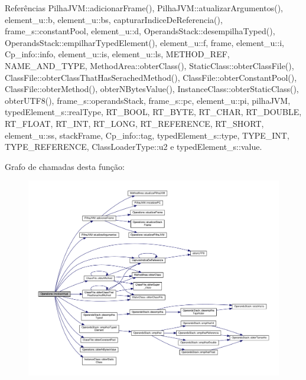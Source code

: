 Referências Pilha\+J\+V\+M\+::adicionar\+Frame(), Pilha\+J\+V\+M\+::atualizar\+Argumentos(), element\+\_\+u\+::b, element\+\_\+u\+::bs, capturar\+Indice\+De\+Referencia(), frame\+\_\+s\+::constant\+Pool, element\+\_\+u\+::d, Operands\+Stack\+::desempilha\+Typed(), Operands\+Stack\+::empilhar\+Typed\+Element(), element\+\_\+u\+::f, frame, element\+\_\+u\+::i, Cp\+\_\+info\+::info, element\+\_\+u\+::is, element\+\_\+u\+::ls, M\+E\+T\+H\+O\+D\+\_\+\+R\+EF, N\+A\+M\+E\+\_\+\+A\+N\+D\+\_\+\+T\+Y\+PE, Method\+Area\+::obter\+Class(), Static\+Class\+::obter\+Class\+File(), Class\+File\+::obter\+Class\+That\+Has\+Serached\+Method(), Class\+File\+::obter\+Constant\+Pool(), Class\+File\+::obter\+Method(), obter\+N\+Bytes\+Value(), Instance\+Class\+::obter\+Static\+Class(), obter\+U\+T\+F8(), frame\+\_\+s\+::operands\+Stack, frame\+\_\+s\+::pc, element\+\_\+u\+::pi, pilha\+J\+VM, typed\+Element\+\_\+s\+::real\+Type, R\+T\+\_\+\+B\+O\+OL, R\+T\+\_\+\+B\+Y\+TE, R\+T\+\_\+\+C\+H\+AR, R\+T\+\_\+\+D\+O\+U\+B\+LE, R\+T\+\_\+\+F\+L\+O\+AT, R\+T\+\_\+\+I\+NT, R\+T\+\_\+\+L\+O\+NG, R\+T\+\_\+\+R\+E\+F\+E\+R\+E\+N\+CE, R\+T\+\_\+\+S\+H\+O\+RT, element\+\_\+u\+::ss, stack\+Frame, Cp\+\_\+info\+::tag, typed\+Element\+\_\+s\+::type, T\+Y\+P\+E\+\_\+\+I\+NT, T\+Y\+P\+E\+\_\+\+R\+E\+F\+E\+R\+E\+N\+CE, Class\+Loader\+Type\+::u2 e typed\+Element\+\_\+s\+::value.

Grafo de chamadas desta função\+:
\nopagebreak
\begin{figure}[H]
\begin{center}
\leavevmode
\includegraphics[width=350pt]{classOperations_acf53d7e184b8828702b4d5036ef0a7a9_cgraph}
\end{center}
\end{figure}
\mbox{\label{classOperations_aaa890c310bc7a93e97b2c5004df94e70}} 
